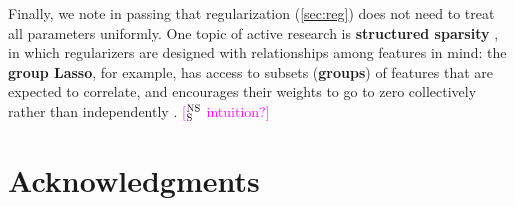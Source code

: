 \documentclass[11pt,letterpaper]{article}
\newcommand{\ensuretext}[1]{#1}
\newcommand{\nssmarker}{\ensuretext{\textcolor{magenta}{\ensuremath{^{\textsc{NS}}_{\textsc{S}}}}}}
\newcommand{\arkcomment}[3]{\ensuretext{\textcolor{#3}{[#1 #2]}}}
\newcommand{\nss}[1]{\arkcomment{\nssmarker}{#1}{magenta}}
\begin{document}
Finally, we note in passing that regularization (\cref{sec:reg}) does not need to treat all parameters uniformly. 
One topic of active research is \textbf{structured sparsity} \citep{martins-tutorial}, 
in which regularizers are designed with relationships among features in mind: 
the \textbf{group Lasso}, for example, has access to subsets (\textbf{groups}) of features 
that are expected to correlate, and encourages their weights to go to zero collectively rather than independently \citep{meier-08}.
\nss{intuition?}





% 
% 
% 



\section*{Acknowledgments}
\end{document}
